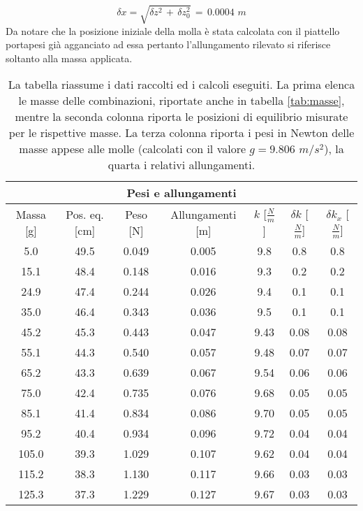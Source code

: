 \begin{equation*}
	\delta x = \sqrt{\delta z^2\, + \,\delta z_0^2} \,=\, 0.0004 \,\, m
\end{equation*}
%
Da notare che la posizione iniziale della molla è stata calcolata con il piattello portapesi già agganciato ad essa pertanto l'allungamento rilevato si riferisce soltanto alla massa applicata.\\

\begin{table}
    \centering
    \begin{tabular}{c c c c c c c}
        \multicolumn{7}{c}{\textbf{Pesi e allungamenti}} \\[1mm]
        \toprule
        Massa [g] & Pos. eq. [cm] & Peso [N] & Allungamenti [m] & $k$ [$\frac{N}{m}$] & $\delta k$ [$\frac{N}{m}$] & $\delta k_x$ [$\frac{N}{m}$]\\
        \midrule
        5.0 & 49.5 & 0.049 & 0.005 & 9.8 & 0.8 & 0.8 \\
		15.1 & 48.4 & 0.148 & 0.016 & 9.3 & 0.2 & 0.2 \\
		24.9 & 47.4 & 0.244 & 0.026 & 9.4 & 0.1 & 0.1 \\
		35.0 & 46.4 & 0.343 & 0.036 & 9.5 & 0.1 & 0.1 \\
		45.2 & 45.3 & 0.443 & 0.047 & 9.43 & 0.08 & 0.08 \\
		55.1 & 44.3 & 0.540 & 0.057 & 9.48 & 0.07 & 0.07 \\
		65.2 & 43.3 & 0.639 & 0.067 & 9.54 & 0.06 & 0.06 \\
		75.0 & 42.4 & 0.735 & 0.076 & 9.68 & 0.05 & 0.05 \\
		85.1 & 41.4 & 0.834 & 0.086 & 9.70 & 0.05 & 0.05 \\
		95.2 & 40.4 & 0.934 & 0.096 & 9.72 & 0.04 & 0.04 \\
		105.0 & 39.3 & 1.029 & 0.107 & 9.62 & 0.04 & 0.04 \\
		115.2 & 38.3 & 1.130 & 0.117 & 9.66 & 0.03 & 0.03 \\
		125.3 & 37.3 & 1.229 & 0.127 & 9.67 & 0.03 & 0.03 \\
        \bottomrule
    \end{tabular}
    \caption{La tabella riassume i dati raccolti ed i calcoli eseguiti. La prima elenca le masse delle combinazioni, riportate anche in tabella
        \ref{tab:masse}, mentre la seconda colonna riporta le posizioni di equilibrio misurate per le rispettive masse.
        La terza colonna riporta i pesi in Newton
        delle masse appese alle molle (calcolati con il valore $g = 9.806 \,\, m/s^2$), la quarta i relativi allungamenti.
}
\end{table}
